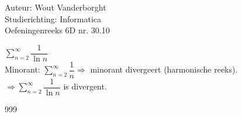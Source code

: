 \documentclass[a4paper]{article}
\begin{document}
  
\noindent \large Auteur: Wout Vanderborght\\
\noindent \large Studierichting: Informatica\\
\noindent \large Oefeningenreeks 6D nr. 30.10\\

\medskip

\normalsize

$ \displaystyle\sum_{n=2}^{\infty} \dfrac{1}{\ln n} $ \\

Minorant: $ \displaystyle\sum_{n=2}^{\infty} \dfrac{1}{n} \Rightarrow $ minorant divergeert (harmonische reeks).\\

$ \Rightarrow \displaystyle\sum_{n=2}^{\infty} \dfrac{1}{\ln n} $ is divergent. \\

\begin{thebibliography}{999}
\end{thebibliography}
\end{document}
